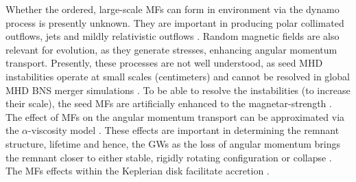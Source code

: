 Whether the ordered, large-scale \acp{MF} can form in \pmerg{} environment 
via the dynamo process is presently unknown. They are important in producing 
polar collimated outflows, jets \citep{Bucciantini:2011kx,Ruiz:2016rai} and mildly relativistic 
outflows \citep{Metzger:2018qfl,Fernandez:2018kax}. Random magnetic fields are also 
relevant for \pmerg{} evolution, as they generate stresses, enhancing angular momentum transport. 
Presently, these processes are not well understood, as seed \ac{MHD} instabilities operate at 
small scales (centimeters) and cannot be resolved in global \ac{MHD} \ac{BNS} merger 
simulations
.
To be able to resolve the instabilities (to increase their scale), the seed \acp{MF} are 
artificially enhanced to the magnetar-strength \citep{Kiuchi:2015sga,Kiuchi:2017zzg}.
%
The effect of \acp{MF} on the angular momentum transport can be approximated via 
the $\alpha$-viscosity model \citep{Shakura:1972te}. 
These effects are important 
in determining the remnant structure, lifetime and hence, the \pmerg{} \acp{GW} 
\citep{Radice:2017zta,Shibata:2017xht} 
as the loss of angular momentum brings the remnant closer to either stable, 
rigidly rotating configuration or collapse \citep{Hotokezaka:2013iia}. 
%
The \acp{MF} effects within the Keplerian disk facilitate accretion 
\citep{Fernandez:2015use,Fujibayashi:2017puw,Fernandez:2018kax,Miller:2019dpt}.

